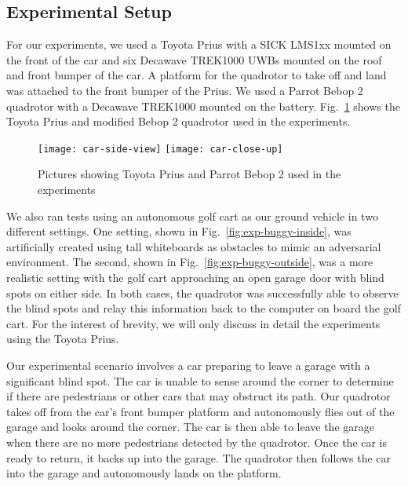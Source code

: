 \subsection{Experimental Setup}

For our experiments, we used a Toyota Prius with a SICK LMS1xx mounted on the
front of the car and six Decawave TREK1000 UWBs mounted on the
roof and front bumper of the car. A platform for the quadrotor to take off and
land was attached to the front bumper of the Prius. We used a Parrot Bebop 2
quadrotor with a Decawave TREK1000 mounted on the battery.  Fig.~\ref{fig:car}
shows the Toyota Prius and modified Bebop 2 quadrotor used in the experiments.

\begin{figure}[h!]

    \centering

    \texttt{[image: car-side-view]}
    \texttt{[image: car-close-up]}

    \caption{Pictures showing Toyota Prius and Parrot Bebop 2 used in the
    experiments}

    \label{fig:car}

\end{figure}

We also ran tests using an autonomous golf cart as our ground vehicle in two
different settings.  One setting, shown in Fig.~\ref{fig:exp-buggy-inside}, was
artificially created using tall whiteboards as obstacles to mimic an
adversarial environment. The second, shown in Fig.~\ref{fig:exp-buggy-outside},
was a more realistic setting with the golf cart approaching an open garage door
with blind spots on either side. In both cases, the quadrotor was successfully
able to observe the blind spots and relay this information back to the computer
on board the golf cart. For the interest of brevity, we will only discuss in
detail the experiments using the Toyota Prius.

Our experimental scenario involves a car preparing to leave a garage with a
significant blind spot. The car is unable to sense around the corner to
determine if there are pedestrians or other cars that may obstruct its path.
Our quadrotor takes off from the car's front bumper platform and autonomously
flies out of the garage and looks around the corner. The car is then able to
leave the garage when there are no more pedestrians detected by the quadrotor.
Once the car is ready to return, it backs up into the garage. The quadrotor
then follows the car into the garage and autonomously lands on the platform.

